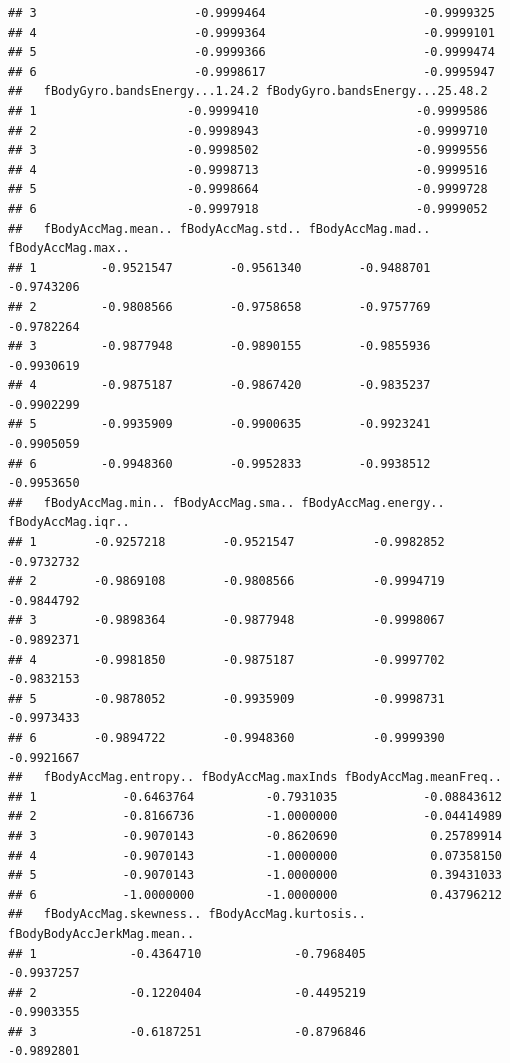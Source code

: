\documentclass[
]{article}
\begin{document}
\begin{verbatim}
## 3                      -0.9999464                      -0.9999325
## 4                      -0.9999364                      -0.9999101
## 5                      -0.9999366                      -0.9999474
## 6                      -0.9998617                      -0.9995947
##   fBodyGyro.bandsEnergy...1.24.2 fBodyGyro.bandsEnergy...25.48.2
## 1                     -0.9999410                      -0.9999586
## 2                     -0.9998943                      -0.9999710
## 3                     -0.9998502                      -0.9999556
## 4                     -0.9998713                      -0.9999516
## 5                     -0.9998664                      -0.9999728
## 6                     -0.9997918                      -0.9999052
##   fBodyAccMag.mean.. fBodyAccMag.std.. fBodyAccMag.mad.. fBodyAccMag.max..
## 1         -0.9521547        -0.9561340        -0.9488701        -0.9743206
## 2         -0.9808566        -0.9758658        -0.9757769        -0.9782264
## 3         -0.9877948        -0.9890155        -0.9855936        -0.9930619
## 4         -0.9875187        -0.9867420        -0.9835237        -0.9902299
## 5         -0.9935909        -0.9900635        -0.9923241        -0.9905059
## 6         -0.9948360        -0.9952833        -0.9938512        -0.9953650
##   fBodyAccMag.min.. fBodyAccMag.sma.. fBodyAccMag.energy.. fBodyAccMag.iqr..
## 1        -0.9257218        -0.9521547           -0.9982852        -0.9732732
## 2        -0.9869108        -0.9808566           -0.9994719        -0.9844792
## 3        -0.9898364        -0.9877948           -0.9998067        -0.9892371
## 4        -0.9981850        -0.9875187           -0.9997702        -0.9832153
## 5        -0.9878052        -0.9935909           -0.9998731        -0.9973433
## 6        -0.9894722        -0.9948360           -0.9999390        -0.9921667
##   fBodyAccMag.entropy.. fBodyAccMag.maxInds fBodyAccMag.meanFreq..
## 1            -0.6463764          -0.7931035            -0.08843612
## 2            -0.8166736          -1.0000000            -0.04414989
## 3            -0.9070143          -0.8620690             0.25789914
## 4            -0.9070143          -1.0000000             0.07358150
## 5            -0.9070143          -1.0000000             0.39431033
## 6            -1.0000000          -1.0000000             0.43796212
##   fBodyAccMag.skewness.. fBodyAccMag.kurtosis.. fBodyBodyAccJerkMag.mean..
## 1             -0.4364710             -0.7968405                 -0.9937257
## 2             -0.1220404             -0.4495219                 -0.9903355
## 3             -0.6187251             -0.8796846                 -0.9892801

\end{verbatim}
\end{document}
